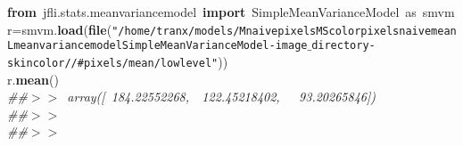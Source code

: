 \noindent
\mbox{}\textbf{from}\ jfli.stats.meanvariancemodel\ \textbf{import}\ SimpleMeanVarianceModel\ as\ smvm \\
\mbox{}r=smvm.\textbf{load}(\textbf{file}(\texttt{"{}/home/tranx/models/MnaivepixelsMScolorpixelsnaivemeanLmeanvariancemodelSimpleMeanVarianceModel-image$\_$directory-skincolor//\#pixels/mean/lowlevel"{}})) \\
\mbox{}r.\textbf{mean}() \\
\mbox{}\textit{\#\#$>$$>$\ array([\ 184.22552268,\ \ 122.45218402,\ \ \ 93.20265846])} \\
\mbox{}\textit{\#\#$>$$>$\ } \\
\mbox{}\textit{\#\#$>$$>$\ } \\
\mbox{} \\
\mbox{}